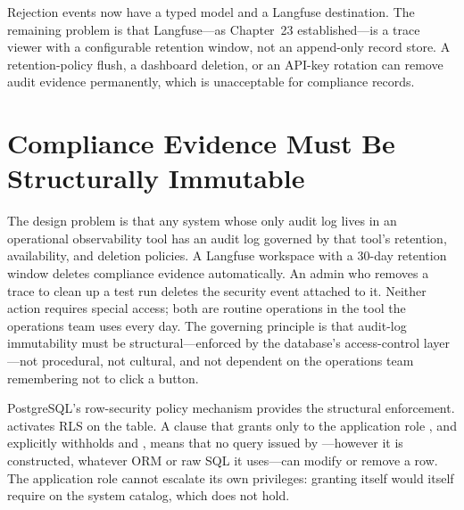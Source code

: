 Rejection events now have a typed model and a Langfuse destination.
The remaining problem is that Langfuse---as Chapter~23 established---is
a trace viewer with a configurable retention window, not an append-only
record store. A retention-policy flush, a dashboard deletion, or an
API-key rotation can remove audit evidence permanently, which is
unacceptable for compliance records.


\section{Compliance Evidence Must Be Structurally Immutable}
\label{sec:sec-audit}

The design problem is that any system whose only audit log lives in an
operational observability tool has an audit log governed by that tool's
retention, availability, and deletion policies. A Langfuse workspace
with a 30-day retention window deletes compliance evidence
automatically. An admin who removes a trace to clean up a test run
deletes the security event attached to it. Neither action requires
special access; both are routine operations in the tool the operations
team uses every day. The governing principle is that audit-log
immutability must be structural---enforced by the database's
access-control layer---not procedural, not cultural, and not dependent
on the operations team remembering not to click a button.

PostgreSQL's row-security policy mechanism provides the structural
enforcement.  activates RLS on the table. A  clause
that grants only  to the application role
, and explicitly withholds  and
, means that no query issued by ---however
it is constructed, whatever ORM or raw SQL it uses---can modify or
remove a row. The application role cannot escalate its own privileges:
granting itself  would itself require  on the
 system catalog, which  does not hold.

